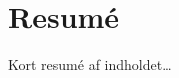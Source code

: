 

\begingroup
\let\clearpage\relax
\let\cleardoublepage\relax
\let\cleardoublepage\relax

\chapter*{Resum\'e} %

Kort resum\'e af indholdet\dots

\endgroup			

\vfill